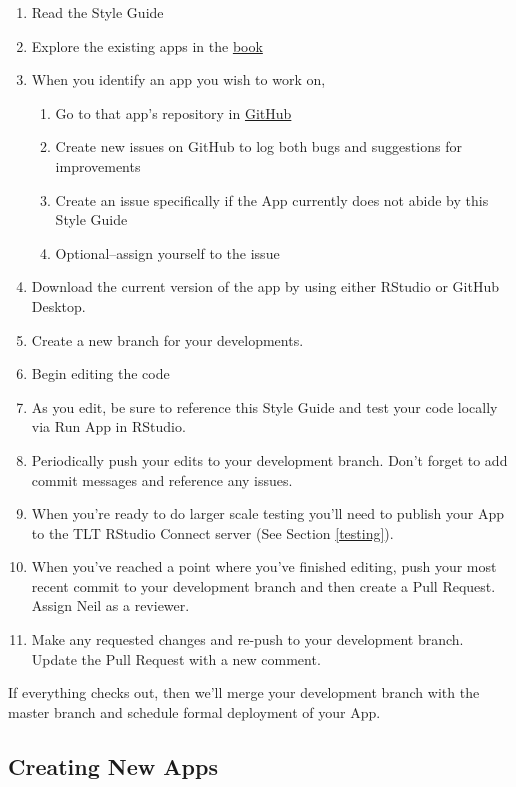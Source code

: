 \documentclass[
]{book}
\providecommand{\tightlist}{%
  \setlength{\itemsep}{0pt}\setlength{\parskip}{0pt}}
\begin{document}
\begin{enumerate}
\def\labelenumi{\arabic{enumi}.}
\tightlist
\item
  Read the Style Guide
\item
  Explore the existing apps in the \href{https://sites.psu.edu/shinyapps/}{book}
\item
  When you identify an app you wish to work on,

  \begin{enumerate}
  \def\labelenumii{\alph{enumii}.}
  \tightlist
  \item
    Go to that app's repository in \href{https://github.com/EducationShinyAppTeam}{GitHub}
  \item
    Create new issues on GitHub to log both bugs and suggestions for improvements
  \item
    Create an issue specifically if the App currently does not abide by this Style Guide
  \item
    Optional--assign yourself to the issue
  \end{enumerate}
\item
  Download the current version of the app by using either RStudio or GitHub Desktop.
\item
  Create a new branch for your developments.
\item
  Begin editing the code
\item
  As you edit, be sure to reference this Style Guide and test your code locally via Run App in RStudio.
\item
  Periodically push your edits to your development branch. Don't forget to add commit messages and reference any issues.
\item
  When you're ready to do larger scale testing you'll need to publish your App to the TLT RStudio Connect server (See Section \ref{testing}).
\item
  When you've reached a point where you've finished editing, push your most recent commit to your development branch and then create a Pull Request. Assign Neil as a reviewer.
\item
  Make any requested changes and re-push to your development branch. Update the Pull Request with a new comment.
\end{enumerate}

If everything checks out, then we'll merge your development branch with the master branch and schedule formal deployment of your App.

\hypertarget{creating-new-apps}{%
\subsection{Creating New Apps}\label{creating-new-apps}}
\end{document}
